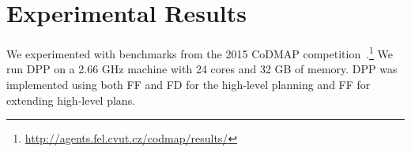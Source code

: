 \documentclass[letterpaper]{article}
\newcommand\roni[1]{\textcolor{blue}{roni: #1}}
\newcommand\guy[1]{\textcolor{red}{guy: #1}}
\theoremstyle{definition}
\begin{document}

\section{Experimental Results}

We experimented with benchmarks from the 2015 CoDMAP competition~\cite{vstolba2015competition}.\footnote{\url{http://agents.fel.cvut.cz/codmap/results/}} 
We run DPP on a 2.66 GHz machine with 24 cores and 32 GB of memory. DPP was implemented using both FF \cite{hoffmann2001ff} and FD \cite{helmert2009landmarks} for the high-level planning and FF for extending high-level plans.


\end{document}
